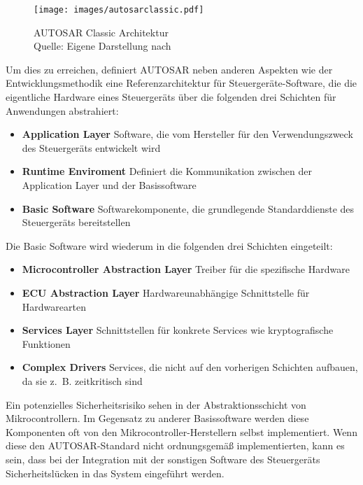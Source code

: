 \begin{figure}
	\centering
	\texttt{[image: images/autosarclassic.pdf]}
	\caption{AUTOSAR Classic Architektur \\ Quelle: Eigene Darstellung nach \cite{autosarlayers}}
	\label{fig:autosarlayers}
\end{figure}

Um dies zu erreichen, definiert AUTOSAR neben anderen Aspekten wie der Entwicklungsmethodik eine Referenzarchitektur für Steuergeräte-Software, die die eigentliche Hardware eines Steuergeräts über die folgenden drei Schichten für Anwendungen abstrahiert:

\begin{itemize}
\item \textbf{Application Layer} Software, die vom Hersteller für den Verwendungszweck des Steuergeräts entwickelt wird
\item \textbf{Runtime Enviroment} Definiert die Kommunikation zwischen der Application Layer und der Basissoftware
\item \textbf{Basic Software} Softwarekomponente, die grundlegende Standarddienste des Steuergeräts bereitstellen
\end{itemize}

Die Basic Software wird wiederum in die folgenden drei Schichten eingeteilt:
\begin{itemize}
\item \textbf{Microcontroller Abstraction Layer} Treiber für die spezifische Hardware
\item \textbf{ECU Abstraction Layer} Hardwareunabhängige Schnittstelle für Hardwarearten
\item \textbf{Services Layer} Schnittstellen für konkrete Services wie kryptografische Funktionen
\item \textbf{Complex Drivers} Services, die nicht auf den vorherigen Schichten aufbauen, da sie z. B. zeitkritisch sind
\end{itemize}

\cite[]{autosarlayers}

Ein potenzielles Sicherheitsrisiko sehen \citet{attackingAutosar} in der Abstraktionsschicht von Mikrocontrollern. Im Gegensatz zu anderer Basissoftware werden diese Komponenten oft von den Mikrocontroller-Herstellern selbst implementiert. Wenn diese den AUTOSAR-Standard nicht ordnungsgemäß implementierten, kann es sein, dass bei der Integration mit der sonstigen Software des Steuergeräts Sicherheitslücken in das System eingeführt werden.

